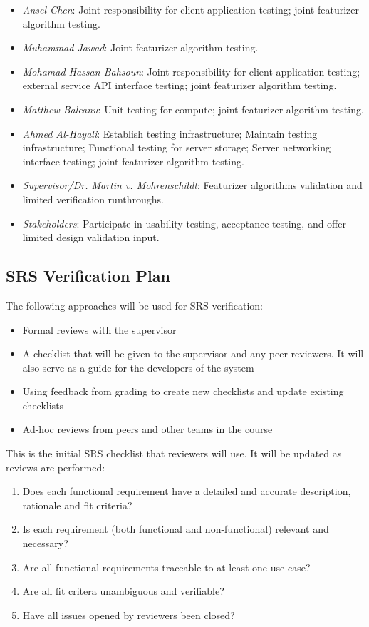\documentclass[12pt, titlepage]{article}
\begin{document}
\begin{itemize}
  \item \emph{Ansel Chen}: Joint responsibility for client application testing; joint featurizer algorithm testing.
  \item \emph{Muhammad Jawad}: Joint featurizer algorithm testing.
  \item \emph{Mohamad-Hassan Bahsoun}: Joint responsibility for client application testing; external service API interface testing; joint featurizer algorithm testing.
  \item \emph{Matthew Baleanu}: Unit testing for compute; joint featurizer algorithm testing.
  \item \emph{Ahmed Al-Hayali}: Establish testing infrastructure; Maintain testing infrastructure; Functional testing for server storage; Server networking interface testing; joint featurizer algorithm testing.
  \item \emph{Supervisor/Dr. Martin v. Mohrenschildt}: Featurizer algorithms validation and limited verification runthroughs.
  \item \emph{Stakeholders}: Participate in usability testing, acceptance testing, and offer limited design validation input.
\end{itemize}

\subsection{SRS Verification Plan}
The following approaches will be used for SRS verification:
\begin{itemize}
  \item Formal reviews with the supervisor
  \item A checklist that will be given to the supervisor and any peer reviewers. It will also
  serve as a guide for the developers of the system
  \item Using feedback from grading to create new checklists and update existing checklists
  \item Ad-hoc reviews from peers and other teams in the course
\end{itemize}
This is the initial SRS checklist that reviewers will use. It will be updated as reviews are performed:
\begin{enumerate}[label=$\square$]
  \item Does each functional requirement have a detailed and accurate description, rationale and fit criteria?
  \item Is each requirement (both functional and non-functional) relevant and necessary?
  \item Are all functional requirements traceable to at least one use case?
  \item Are all fit critera unambiguous and verifiable?
  \item Have all issues opened by reviewers been closed? 
\end{enumerate}
\end{document}
